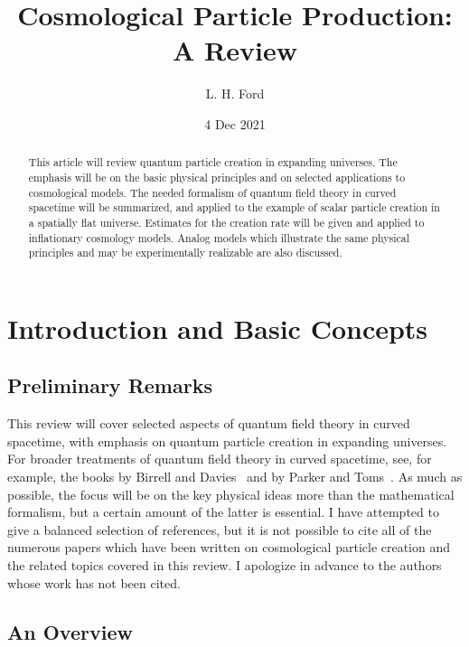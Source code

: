 \documentclass[12pt,onecolumn,eqsecnum,floats,aps,prd,floatfix,titlepage]{revtex4-2}
\begin{document}
\title{Cosmological Particle Production: A Review}
\author{L. H. Ford}
\date{4 Dec 2021}

\begin{abstract}
This article will review quantum particle creation in expanding universes. The emphasis will be on the basic physical
principles and on selected applications to cosmological models. The needed formalism of quantum field theory in
curved spacetime will be summarized, and applied to the example of scalar particle creation in a spatially flat universe.
Estimates for the creation rate will be given and applied to inflationary cosmology models. Analog models which
illustrate the same physical principles and may be experimentally realizable are also discussed. 
\end{abstract}

\maketitle


\section{Introduction and Basic Concepts}
\label{sec:basic}

\subsection{Preliminary Remarks}
\label{sec:prelim}

This review will cover selected aspects of quantum field theory in curved spacetime, with emphasis
on quantum particle creation in expanding universes. For broader treatments of quantum field theory 
in curved spacetime, see, for example, the books by Birrell and Davies~\cite{BD} and by Parker 
and Toms~\cite{PT}. As much as possible, the focus will be on the key physical ideas more than
the mathematical formalism, but a certain amount of the latter is essential. I have attempted to give
a balanced selection of references, but it is not possible to cite all of the numerous papers which have 
been written on cosmological particle creation and the related topics covered in this review.
I apologize in advance to the authors whose work has not been cited.


\subsection{An Overview}
\label{sec:overview}
\end{document}
